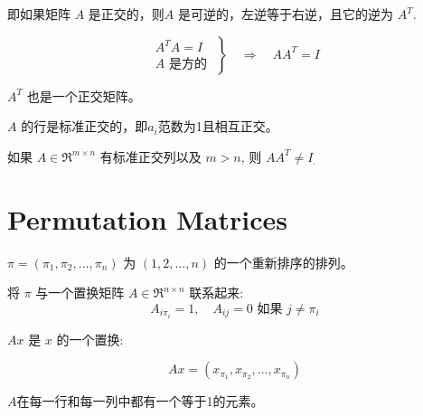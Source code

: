\begin{theorem}[正交矩阵满足非奇异性]
    
    即如果矩阵 $ A $ 是正交的，则$ A $ 是可逆的，左逆等于右逆，且它的逆为 $ A^{T} $.

    \begin{equation} \left.\begin{array}{l}A^{T} A=I \\ A \text { 是方的 }\end{array}\right\} \quad \Rightarrow \quad A A^{T}=I \end{equation}
\end{theorem}

\begin{corollary}
    $ A^{T} $ 也是一个正交矩阵。
\end{corollary}

\begin{corollary}
    $ A $ 的行是标准正交的，即$a_i$范数为1且相互正交。
\end{corollary}

\begin{remark}
    如果 $ A \in \mathfrak{R}^{m \times n} $ 有标准正交列以及 $ m>n $, 则 $ A A^{T} \neq I_{\text {. }} $
\end{remark}

\section{Permutation Matrices}

\begin{notation}
    $ \pi=\left(\pi_{1}, \pi_{2}, \ldots, \pi_{n}\right) $ 为 $ (1,2, \ldots, n) $ 的一个重新排序的排列。

    将 $ \pi $ 与一个置换矩阵 $ A \in \mathfrak{R}^{n \times n} $ 联系起来:
\begin{equation}
A_{i \pi_{i}}=1, \quad A_{i j}=0 \text { 如果 } j \neq \pi_{i}
\end{equation}
\end{notation}

\begin{definition}[置换]
    $ A x $ 是 $ x $ 的一个置换:
    
    \begin{equation} A x=\left(x_{\pi_{1}}, x_{\pi_{2}}, \ldots, x_{\pi_{n}}\right) \end{equation}
\end{definition}

$A$在每一行和每一列中都有一个等于1的元素。

